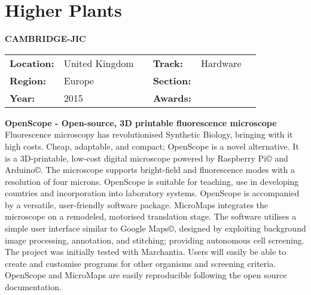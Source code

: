 \section{Higher Plants}
\textbf{\uppercase{Cambridge-JIC}}
\FloatBarrier
\begin{table}[h]
\begin{tabular}{lp{2.5cm}llll}
\textbf{Location:} & United Kingdom & \multicolumn{1}{|l}{} & \textbf{Track:}   & Hardware \\
\textbf{Region:}   & Europe   & \multicolumn{1}{|l}{} & \textbf{Section:} &  \\
\textbf{Year:}     & 2015   & \multicolumn{1}{|l}{} & \textbf{Awards:}  &
\end{tabular}
\end{table}
\FloatBarrier
\noindent	\textbf{OpenScope - Open-source, 3D printable fluorescence microscope} \vspace{.2cm}\\
Fluorescence microscopy has revolutionised Synthetic Biology, bringing with it high costs. Cheap, adaptable, and compact; OpenScope is a novel alternative. It is a 3D-printable, low-cost digital microscope powered by Raspberry Pi© and Arduino©. The microscope supports bright-field and fluorescence modes with a resolution of four microns. OpenScope is suitable for teaching, use in developing countries and incorporation into laboratory systems. OpenScope is accompanied by a versatile, user-friendly software package. MicroMaps integrates the microscope on a remodeled, motorised translation stage. The software utilises a simple user interface similar to Google Maps©, designed by exploiting background image processing, annotation, and stitching; providing autonomous cell screening. The project was initially tested with Marchantia. Users will easily be able to create and customise programs for other organisms and screening criteria. OpenScope and MicroMaps are easily reproducible following the open source documentation.
\vspace{2cm}


